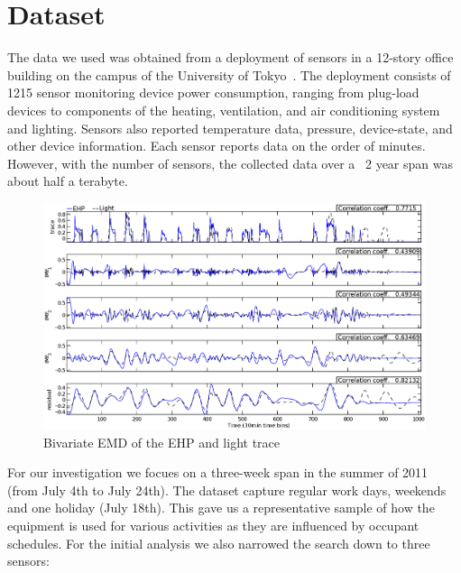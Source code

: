 \section{Dataset}
The data we used was obtained from a deployment of sensors in a 12-story office building
on the campus of the University of Tokyo~\cite{gutp, ogawa:lncs2011}.  The deployment consists of 
1215 sensor monitoring device power consumption, ranging from plug-load devices to components of the
heating, ventilation, and air conditioning system and lighting.  Sensors also reported temperature
data, pressure, device-state, and other device information.  Each sensor reports data on the
order of minutes.  However, with the number of sensors, the collected data over a ~2 year
span was about half a terabyte.


\begin{figure}[tb]
\hspace{-2cm}
\includegraphics[width=1.2\textwidth]{img/emd_25_26.eps}
\vspace{-1cm}
\caption{Bivariate EMD of the EHP and light trace}
\label{fig:emd}
\end{figure}



For our investigation we focues on a three-week span in the summer of 2011 (from July 4th to July 24th).
The dataset capture regular work days, weekends and one holiday (July 18th).  This gave us a representative sample
of how the equipment is used for various activities as they are influenced by occupant schedules.  For the initial
analysis we also narrowed the search down to three sensors:

